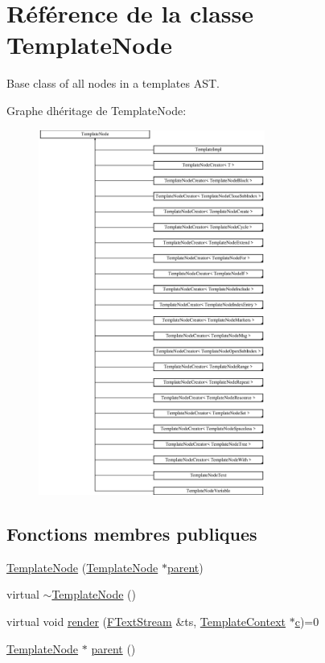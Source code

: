 \hypertarget{class_template_node}{}\section{Référence de la classe Template\+Node}
\label{class_template_node}


Base class of all nodes in a template\textquotesingle{}s A\+S\+T.  


Graphe d\textquotesingle{}héritage de Template\+Node\+:\begin{figure}[H]
\begin{center}
\leavevmode
\includegraphics[height=12.000000cm]{class_template_node}
\end{center}
\end{figure}
\subsection*{Fonctions membres publiques}
\begin{DoxyCompactItemize}
\item 
\hyperlink{class_template_node_a8bdf67203f3fc13e54922d53a381d310}{Template\+Node} (\hyperlink{class_template_node}{Template\+Node} $\ast$\hyperlink{class_template_node_a69a306ef84e62af9fe57bf9aacc94536}{parent})
\item 
virtual \hyperlink{class_template_node_a059c90e4bc538b06f25449252b56683a}{$\sim$\+Template\+Node} ()
\item 
virtual void \hyperlink{class_template_node_adb2714489a8bb9aee4fc97c0d16eb6f4}{render} (\hyperlink{class_f_text_stream}{F\+Text\+Stream} \&ts, \hyperlink{class_template_context}{Template\+Context} $\ast$\hyperlink{060__command__switch_8tcl_ab14f56bc3bd7680490ece4ad7815465f}{c})=0
\item 
\hyperlink{class_template_node}{Template\+Node} $\ast$ \hyperlink{class_template_node_a69a306ef84e62af9fe57bf9aacc94536}{parent} ()
\end{DoxyCompactItemize}


